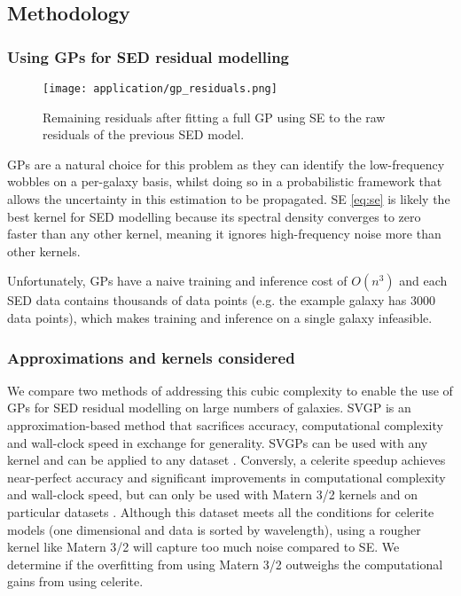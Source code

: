 \subsection{Methodology}
\subsubsection{Using GPs for SED residual modelling}
\begin{figure}[H]
    \texttt{[image: application/gp\_residuals.png]}
    \caption{Remaining residuals after fitting a full GP using SE \cite{galaxy-gp-noise} to the raw residuals of the previous SED model.}
\end{figure}
GPs are a natural choice for this problem as they can identify the low-frequency wobbles on a per-galaxy basis, whilst doing so in a probabilistic framework that allows the uncertainty in this estimation to be propagated. SE \ref{eq:se} is likely the best kernel for SED modelling because its spectral density converges to zero faster than any other kernel, meaning it ignores high-frequency noise more than other kernels. 

Unfortunately, GPs have a naive training and inference cost of $O(n^3)$ and each SED data contains thousands of data points (e.g. the example galaxy has 3000 data points), which makes training and inference on a single galaxy infeasible. 

\subsubsection{Approximations and kernels considered}
We compare two methods of addressing this cubic complexity to enable the use of GPs for SED residual modelling on large numbers of galaxies. SVGP is an approximation-based method that sacrifices accuracy, computational complexity and wall-clock speed in exchange for generality. SVGPs can be used with any kernel and can be applied to any dataset \cite{svgp}. Conversly, a celerite speedup achieves near-perfect accuracy and significant improvements in computational complexity and wall-clock speed, but can only be used with Matern 3/2 kernels and on particular datasets \cite{foreman-mackay}. Although this dataset meets all the conditions for celerite models (one dimensional and data is sorted by wavelength), using a rougher kernel like Matern 3/2 will capture too much noise compared to SE. We determine if the overfitting from using Matern 3/2 outweighs the computational gains from using celerite.

